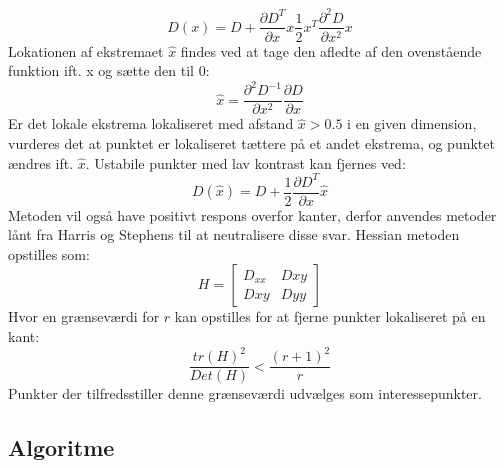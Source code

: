 \begin{equation}
D(x)=D+\dfrac{\partial D^T}{\partial x}x\dfrac{1}{2}x^T\dfrac{\partial^2D}{\partial x^2}x
\end{equation}
Lokationen af ekstremaet $\hat{x}$ findes ved at tage den afledte af den ovenstående funktion ift. x og sætte den til 0:
\begin{equation}
\hat{x}= \dfrac{\partial^2 D^{-1}}{\partial x^2}\dfrac{\partial D}{\partial x}
\end{equation}
Er det lokale ekstrema lokaliseret med afstand $\hat{x}>0.5$ i en given dimension, vurderes det at punktet er lokaliseret tættere på et andet ekstrema, og punktet ændres ift. $\hat{x}$. Ustabile punkter med lav kontrast kan fjernes ved:
\begin{equation}
D(\hat{x})=D+\dfrac{1}{2}\dfrac{\partial D^T}{\partial x}\hat{x}
\end{equation}
Metoden vil også have positivt respons overfor kanter, derfor anvendes metoder lånt fra Harris og Stephens \cite{harris} til at neutralisere disse svar. Hessian metoden opstilles som:
\begin{equation}
H =
\begin{bmatrix}
D_{xx} & D{xy} \\
D{xy} & D{yy}
\end{bmatrix}
\end{equation}
Hvor en grænseværdi for $r$ kan opstilles for at fjerne punkter lokaliseret på en kant:
\begin{equation}
\dfrac{tr(H)^2}{Det(H)}<\dfrac{(r+1)^2}{r}
\end{equation}
Punkter der tilfredsstiller denne grænseværdi udvælges som interessepunkter.
\subsection*{Algoritme}
